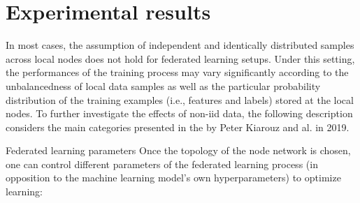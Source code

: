 \documentclass{article}
\theoremstyle{theorem}
\theoremstyle{definition}
\begin{document}
\section{Experimental results}
In most cases, the assumption of independent and identically distributed samples across local nodes does not hold for federated learning setups. Under this setting, the performances of the training process may vary significantly according to the unbalancedness of local data samples as well as the particular probability distribution of the training examples (i.e., features and labels) stored at the local nodes. To further investigate the effects of non-iid data, the following description considers the main categories presented in the by Peter Kiarouz and al. in 2019.

Federated learning parameters
Once the topology of the node network is chosen, one can control different parameters of the federated learning process (in opposition to the machine learning model's own hyperparameters) to optimize learning:
\end{document}
